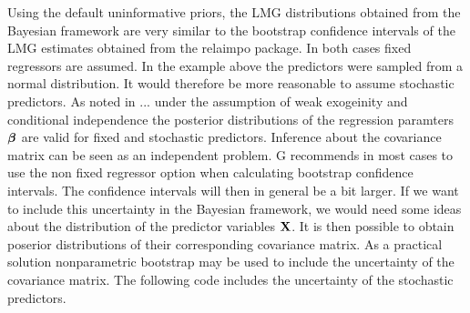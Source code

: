 \documentclass[11pt,a4paper,twoside]{book}\usepackage[]{graphicx}\usepackage[]{color}
\begin{document}
Using the default uninformative priors, the LMG distributions obtained from the Bayesian framework are very similar to the bootstrap confidence intervals of the LMG estimates obtained from the relaimpo package. In both cases fixed regressors are assumed. In the example above the predictors were sampled from a normal distribution. It would therefore be more reasonable to assume stochastic predictors. As noted in ... under the assumption of weak exogeinity and conditional independence the posterior distributions of the regression paramters ${\boldsymbol{\beta}}$ are valid for fixed and stochastic predictors. Inference about the covariance matrix can be seen as an independent problem. G recommends in most cases to use the non fixed regressor option when calculating bootstrap confidence intervals. The confidence intervals will then in general be a bit larger. If we want to include this uncertainty in the Bayesian framework, we would need some ideas about the distribution of the predictor variables ${\mathbf{X}}$. It is then possible to obtain poserior distributions of their corresponding covariance matrix. As a practical solution nonparametric bootstrap may be used to include the uncertainty of the covariance matrix. The following code includes the uncertainty of the stochastic predictors. 
\end{document}
